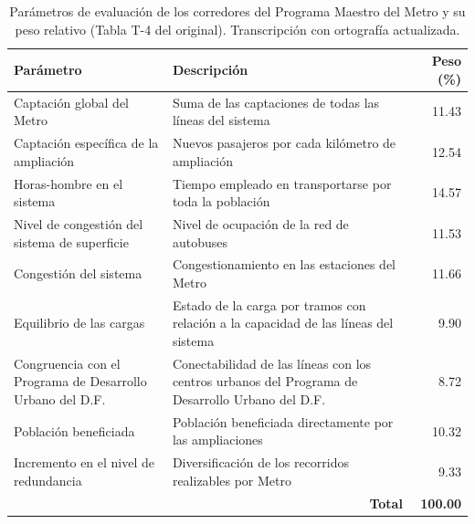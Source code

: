 \begin{table}[H]
    \centering
    \caption[Parámetros de evaluación del Programa Maestro del Metro]{%
    Parámetros de evaluación de los corredores del Programa Maestro del Metro
    y su peso relativo (Tabla T-4 del original). Transcripción con ortografía
    actualizada.}
    \label{tab:anillo-pm-parametros}
    \small
    \setlength{\tabcolsep}{4pt}
    \begin{tabularx}{\textwidth}{|p{4.6cm}|X|r|}
        \hline
        \textbf{Parámetro} & \textbf{Descripción} & \textbf{Peso (\%)} \\
        \hline
        Captación global del Metro & Suma de las captaciones de todas las
            líneas del sistema & 11.43 \\
        \hline
        Captación específica de la ampliación & Nuevos pasajeros por cada
            kilómetro de ampliación & 12.54 \\
        \hline
        Horas-hombre en el sistema & Tiempo empleado en transportarse por toda
            la población & 14.57 \\
        \hline
        Nivel de congestión del sistema de superficie & Nivel de ocupación de la
            red de autobuses & 11.53 \\
        \hline
        Congestión del sistema & Congestionamiento en las estaciones del Metro
            & 11.66 \\
        \hline
        Equilibrio de las cargas & Estado de la carga por tramos con relación a
            la capacidad de las líneas del sistema & 9.90 \\
        \hline
        Congruencia con el Programa de Desarrollo Urbano del D.F. &
            Conectabilidad de las líneas con los centros urbanos del Programa de
            Desarrollo Urbano del D.F. & 8.72 \\
        \hline
        Población beneficiada & Población beneficiada directamente por las
            ampliaciones & 10.32 \\
        \hline
        Incremento en el nivel de redundancia & Diversificación de los
            recorridos realizables por Metro & 9.33 \\
        \hline
        \multicolumn{2}{|r|}{\textbf{Total}} & \textbf{100.00} \\
        \hline
    \end{tabularx}
\end{table}

